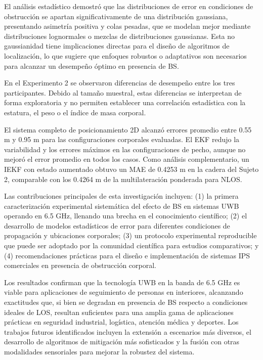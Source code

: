El análisis estadístico demostró que las distribuciones de error en condiciones de obstrucción se apartan significativamente de una distribución gaussiana, presentando asimetría positiva y colas pesadas, que se modelan mejor mediante distribuciones lognormales o mezclas de distribuciones gaussianas. Esta no gaussianidad tiene implicaciones directas para el diseño de algoritmos de localización, lo que sugiere que enfoques robustos o adaptativos son necesarios para alcanzar un desempeño óptimo en presencia de BS.

En el Experimento 2 se observaron diferencias de desempeño entre los tres participantes. Debido al tamaño muestral, estas diferencias se interpretan de forma exploratoria y no permiten establecer una correlación estadística con la estatura, el peso o el índice de masa corporal.

El sistema completo de posicionamiento 2D alcanzó errores promedio entre 0.55 m y 0.95 m para las configuraciones corporales evaluadas. El EKF redujo la variabilidad y los errores máximos en las configuraciones de pecho, aunque no mejoró el error promedio en todos los casos. Como análisis complementario, un IEKF con estado aumentado obtuvo un MAE de 0.4253 m en la cadera del Sujeto 2, comparable con los 0.4264 m de la multilateración ponderada para NLOS.

Las contribuciones principales de esta investigación incluyen: (1) la primera caracterización experimental sistemática del efecto de BS en sistemas UWB operando en 6.5 GHz, llenando una brecha en el conocimiento científico; (2) el desarrollo de modelos estadísticos de error para diferentes condiciones de propagación y ubicaciones corporales; (3) un protocolo experimental reproducible que puede ser adoptado por la comunidad científica para estudios comparativos; y (4) recomendaciones prácticas para el diseño e implementación de sistemas IPS comerciales en presencia de obstrucción corporal.

Los resultados confirman que la tecnología UWB en la banda de 6.5 GHz es viable para aplicaciones de seguimiento de personas en interiores, alcanzando exactitudes que, si bien se degradan en presencia de BS respecto a condiciones ideales de LOS, resultan suficientes para una amplia gama de aplicaciones prácticas en seguridad industrial, logística, atención médica y deportes. Los trabajos futuros identificados incluyen la extensión a escenarios más diversos, el desarrollo de algoritmos de mitigación más sofisticados y la fusión con otras modalidades sensoriales para mejorar la robustez del sistema.

